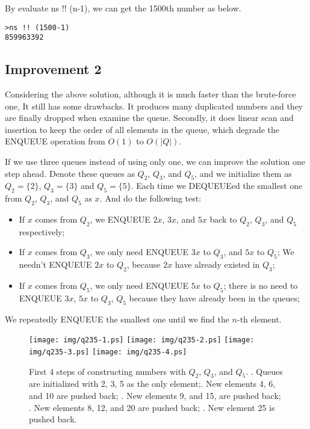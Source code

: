 \documentclass[UTF8]{article}
\begin{document}
By evaluate ns !! (n-1), we can get the 1500th number as
below.

\begin{verbatim}
>ns !! (1500-1)
859963392
\end{verbatim}

\subsection{Improvement 2}
Considering the above solution, although it is much faster than the brute-force one,
It still has some drawbacks. It produces many duplicated numbers and they are
finally dropped when examine the queue. Secondly, it does linear scan and insertion
to keep the order of all elements in the queue, which degrade the ENQUEUE operation
from $O(1)$ to $O(|Q|)$.

If we use three queues instead of using only one, we can improve the solution one
step ahead. Denote these queues as $Q_2$, $Q_3$, and $Q_5$, and we initialize
them as $Q_2=\{ 2 \}$, $Q_3 = \{ 3\}$ and $Q_5 = \{ 5 \}$. Each time we DEQUEUEed
the smallest one from $Q_2$, $Q_3$, and $Q_5$ as $x$. And do the following test:

\begin{itemize}
\item If $x$ comes from $Q_2$, we ENQUEUE $2x$, $3x$, and $5x$ back to
$Q_2$, $Q_3$, and $Q_5$ respectively;
\item If $x$ comes from $Q_3$, we only need ENQUEUE $3x$ to $Q_3$, and $5x$ to $Q_5$;
We needn't ENQUEUE $2x$ to $Q_2$, because $2x$ have already existed in $Q_3$;
\item If $x$ comes from $Q_5$, we only need ENQUEUE $5x$ to $Q_5$; there is
no need to ENQUEUE $3x$, $5x$ to $Q_3$, $Q_5$ because they have already been
in the queues;
\end{itemize}

We repeatedly ENQUEUE the smallest one until we find the $n$-th element.

\begin{figure}[htbp]
       \begin{center}
       	  \texttt{[image: img/q235-1.ps]}
       	  \texttt{[image: img/q235-2.ps]}
       	  \texttt{[image: img/q235-3.ps]}
       	  \texttt{[image: img/q235-4.ps]}
        \caption{First 4 steps of constructing numbers with $Q_2$, $Q_3$, and $Q_5$. . Queues are initialized with 2, 3, 5 as the only element;. New elements 4, 6, and 10 are pushed back; . New elements 9, and 15, are pushed back; . New elements 8, 12, and 20 are pushed back; . New element 25 is pushed back.} \label{fig:q235}
       \end{center}
\end{figure}
\end{document}
